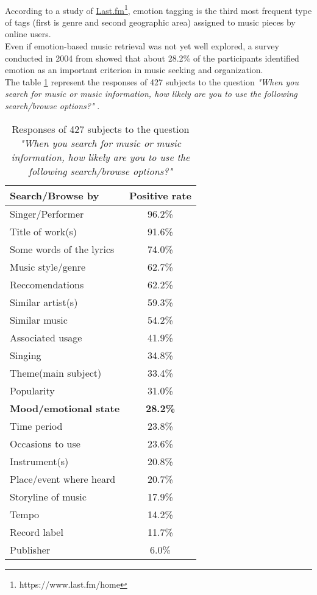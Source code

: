 \\
According to a study of \href{https://www.last.fm/home}{Last.fm}\footnote{https://www.last.fm/home}, emotion tagging is the third most frequent type of tags (first is genre and second geographic area) assigned to music pieces by online users.
\\ Even if emotion-based music retrieval was not yet well explored, a survey conducted in 2004 from \cite{lee2004survey} showed that about 28.2\% of the participants identified emotion as an important criterion in music seeking and organization.
\\
The table \ref{table:browse_music} represent the responses of 427 subjects to the question \textit{"When you search for music or music information, how likely are you to use the following search/browse options?"} \cite{lee2004survey}.
\begin{table}[h!]
	\centering
	\begin{tabular}{|l | c|}
		\hline
		Search/Browse by & Positive rate\\ [0.5ex] 
		\hline\hline Singer/Performer 			&		96.2\%	\\ 
		\hline	Title of work(s) 					& 		91.6\%	\\ 
		\hline	Some words of the lyrics 	& 		74.0\% 	\\
		\hline	Music style/genre 				&		62.7\%	\\
		\hline	Reccomendations 				&		62.2\%	\\
		\hline	Similar artist(s)					&		59.3\%	\\
		\hline	Similar music 					&		54.2\%	\\
		\hline	Associated usage				&		41.9\% 	\\
		\hline	Singing								&		34.8\% 	\\
		\hline	Theme(main subject)			&		33.4\% 	\\
		\hline	Popularity							&		31.0\% 	\\
		\hline	\textbf{Mood/emotional state	}	&		\textbf{28.2\%} 	\\
		\hline	Time period						&		23.8\% 	\\
		\hline	Occasions to use				&		23.6\% 	\\
		\hline	Instrument(s)					&		20.8\% 	\\
		\hline	Place/event where heard	&		20.7\% 	\\
		\hline	Storyline of music				&		17.9\% 	\\
		\hline	Tempo								&		14.2\% 	\\
		\hline	Record label						&		11.7\% 	\\
		\hline	Publisher							&		6.0\% 	\\
		\hline
	\end{tabular}
	\caption{Responses of 427 subjects to the question \textit{"When you search for music or music information, how likely are you to use the following search/browse options?"}}
	\label{table:browse_music}
\end{table}
